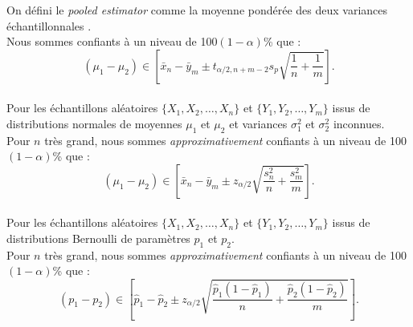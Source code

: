 \documentclass[10pt, french]{article}
\begin{document}
\begin{multicols*}{2}
\begin{definitionNOHFILLsub}
On défini le \og \textit{pooled estimator} \fg{} comme la moyenne pondérée des deux variances échantillonnales .\\

Nous sommes confiants à un niveau de 100$(1 - \alpha)$\% que :
\begin{equation*}
	(\mu_{1}	-	\mu_{2}) \in \left[ 
	\bar{x}_{n}	-	\bar{y}_{m}
	\pm	t_{\alpha/2, n + m - 2} s_{p}\sqrt{\frac{1}{n} + \frac{1}{m}} \right].
\end{equation*}
\begin{align*}
\end{align*}
\end{definitionNOHFILLsub}

\begin{definitionNOHFILLsub}
Pour les échantillons aléatoires $\{X_{1}, X_{2}, \dots, X_{n}\}$ et $\{Y_{1}, Y_{2}, \dots, Y_{m}\}$ issus de distributions normales de moyennes $\mu_{1}$ et $\mu_{2}$ et variances $\sigma^{2}_{1}$ et $\sigma^{2}_{2}$ inconnues.\\

Pour $n$ très grand, nous sommes \textit{approximativement} confiants à un niveau de 100$(1 - \alpha)$\% que :
\begin{equation*}
	(\mu_{1}	-	\mu_{2}) \in \left[ 
	\bar{x}_{n}	-	\bar{y}_{m}
	\pm	z_{\alpha/2} \sqrt{\frac{s_{n}^{2}}{n} + \frac{s_{m}^{2}}{m}} \right].
\end{equation*}
\begin{align*}
\end{align*}
\end{definitionNOHFILLsub}

\begin{definitionNOHFILLsub}
Pour les échantillons aléatoires $\{X_{1}, X_{2}, \dots, X_{n}\}$ et $\{Y_{1}, Y_{2}, \dots, Y_{m}\}$ issus de distributions Bernoulli de paramètres $p_{1}$ et $p_{2}$.\\

Pour $n$ très grand, nous sommes \textit{approximativement} confiants à un niveau de 100$(1 - \alpha)$\% que :
\begin{equation*}
	(p_{1}	-	p_{2}) \in \left[ 
	\hat{p}_{1}	-	\hat{p}_{2}
	\pm	z_{\alpha/2} \sqrt{\frac{\hat{p}_{1}(1 - \hat{p}_{1})}{n} + \frac{\hat{p}_{2}(1 - \hat{p}_{2})}{m}} \right].
\end{equation*}
\begin{align*}
\end{align*}
\end{definitionNOHFILLsub}



\end{multicols*}
\end{document}

